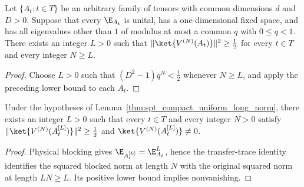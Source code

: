 \begin{lemma}
    \label{thm:spt_compact_uniform_long_norm}
    \leanok
    Let $\{A_t:t\in T\}$ be an arbitrary family of tensors with common
    dimensions $d$ and $D>0$. Suppose that every $\E_{A_t}$ is unital,
    has a one-dimensional fixed space, and has all eigenvalues other than
    $1$ of modulus at most a common $q$ with $0\leq q<1$.
    There exists an integer $L>0$ such that
    $\|\ket{V^{(N)}(A_t)}\|^2\geq\tfrac12$ for every $t\in T$ and
    every integer $N\geq L$.
\end{lemma}
\begin{proof}\leanok
    Choose $L>0$ such that $(D^2-1)q^N<\tfrac12$ whenever $N\geq L$,
    and apply the preceding lower bound to each $A_t$.
\end{proof}

\begin{lemma}
    \label{thm:spt_compact_uniform_blocking_nonzero}
    \leanok
    Under the hypotheses of Lemma~\ref{thm:spt_compact_uniform_long_norm},
    there exists an integer $L>0$ such that every $t\in T$ and every
    integer $N>0$ satisfy
    $\|\ket{V^{(N)}(A_t^{[L]})}\|^2\geq\tfrac12$ and
    $\ket{V^{(N)}(A_t^{[L]})}\ne0$.
\end{lemma}
\begin{proof}\leanok
    Physical blocking gives $\E_{A_t^{[L]}}=\E_{A_t}^L$, hence the
    transfer-trace identity identifies the squared blocked norm at length
    $N$ with the original squared norm at length $LN\geq L$.
    Its positive lower bound implies nonvanishing.
\end{proof}


